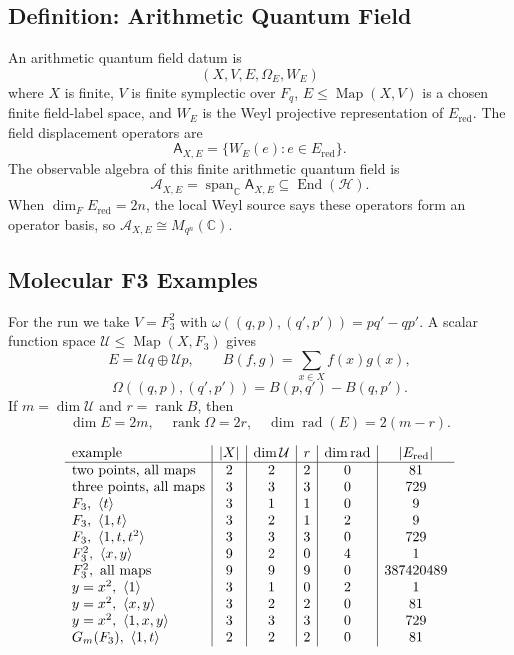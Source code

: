 \subsection{Definition: Arithmetic Quantum Field}

An arithmetic quantum field datum is
\[
  (X,V,E,\Omega_E,W_E)
\]
where \(X\) is finite, \(V\) is finite symplectic over \(F_q\), \(E\leq
\operatorname{Map}(X,V)\) is a chosen finite field-label space, and \(W_E\) is
the Weyl projective representation of \(E_{\mathrm{red}}\).  The field
displacement operators are
\[
  \mathsf A_{X,E}=\{W_E(e):e\in E_{\mathrm{red}}\}.
\]
The observable algebra of this finite arithmetic quantum field is
\[
  \mathcal A_{X,E}
  =
  \operatorname{span}_{\mathbb C}\mathsf A_{X,E}
  \subseteq \operatorname{End}(\mathcal H).
\]
When \(\dim_F E_{\mathrm{red}}=2n\), the local Weyl source says these
operators form an operator basis, so \(\mathcal A_{X,E}\cong M_{q^n}(\mathbb C)\).

\subsection{Molecular F3 Examples}

For the run we take \(V=F_3^2\) with
\(\omega((q,p),(q',p'))=pq'-qp'\).  A scalar function space
\(\mathcal U\leq\operatorname{Map}(X,F_3)\) gives
\[
  E=\mathcal U q\oplus\mathcal U p,\qquad
  B(f,g)=\sum_{x\in X}f(x)g(x),
\]
\[
  \Omega((q,p),(q',p'))=B(p,q')-B(q,p').
\]
If \(m=\dim\mathcal U\) and \(r=\operatorname{rank}B\), then
\[
  \dim E=2m,\quad \operatorname{rank}\Omega=2r,\quad
  \dim\operatorname{rad}(E)=2(m-r).
\]

\[
\begin{array}{l|c|c|c|c|c}
\text{example} & |X| & \dim\mathcal U & r & \dim\operatorname{rad} & |E_{\rm red}|\\
\hline
\text{two points, all maps} & 2&2&2&0&81\\
\text{three points, all maps} & 3&3&3&0&729\\
F_3,\ \langle t\rangle & 3&1&1&0&9\\
F_3,\ \langle1,t\rangle & 3&2&1&2&9\\
F_3,\ \langle1,t,t^2\rangle & 3&3&3&0&729\\
F_3^2,\ \langle x,y\rangle & 9&2&0&4&1\\
F_3^2,\ \text{all maps} & 9&9&9&0&387420489\\
y=x^2,\ \langle1\rangle & 3&1&0&2&1\\
y=x^2,\ \langle x,y\rangle & 3&2&2&0&81\\
y=x^2,\ \langle1,x,y\rangle & 3&3&3&0&729\\
G_m(F_3),\ \langle1,t\rangle & 2&2&2&0&81
\end{array}
\]


